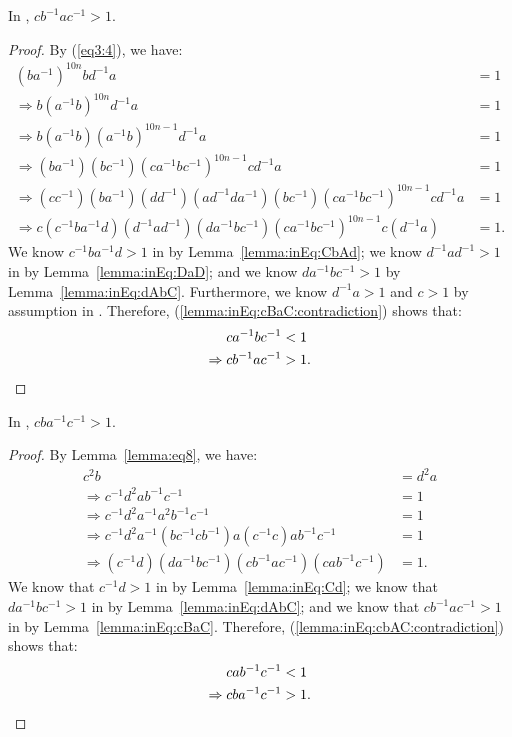 \begin{lemma} In , $cb^{-1}ac^{-1}>1$.
\label{lemma:inEq:cBaC}
\end{lemma}
\begin{proof} By (\ref{eq3:4}), we have:
\begin{align}
(ba^{-1})^{10n}bd^{-1}a&=1\nonumber{}\\
\Rightarrow{}b(a^{-1}b)^{10n}d^{-1}a&=1\nonumber{}\\
\Rightarrow{}b(a^{-1}b)(a^{-1}b)^{10n-1}d^{-1}a&=1\nonumber{}\\
\Rightarrow{}(ba^{-1})(bc^{-1})(ca^{-1}bc^{-1})^{10n-1}cd^{-1}a&=1\nonumber{}\\
\Rightarrow{}(cc^{-1})(ba^{-1})(dd^{-1})(ad^{-1}da^{-1})(bc^{-1})(ca^{-1}bc^{-1})^{10n-1}cd^{-1}a&=1\nonumber{}\\
\Rightarrow{}c(c^{-1}ba^{-1}d)(d^{-1}ad^{-1})(da^{-1}bc^{-1})(ca^{-1}bc^{-1})^{10n-1}c(d^{-1}a)&=1.\label{lemma:inEq:cBaC:contradiction}
\end{align}
We know $c^{-1}ba^{-1}d>1$ in  by Lemma~\ref{lemma:inEq:CbAd}; we know $d^{-1}ad^{-1}>1$ in  by Lemma~\ref{lemma:inEq:DaD}; and we know $da^{-1}bc^{-1}>1$ by Lemma~\ref{lemma:inEq:dAbC}. Furthermore, we know $d^{-1}a>1$ and $c>1$ by assumption in . Therefore, (\ref{lemma:inEq:cBaC:contradiction}) shows that:
\begin{align*}
ca^{-1}bc^{-1}&<1\\
\Rightarrow{}cb^{-1}ac^{-1}&>1.\qedhere
\end{align*}
\end{proof}

\begin{lemma} In , $cba^{-1}c^{-1}>1$.
\label{lemma:inEq:cbAC}
\end{lemma}
\begin{proof} By Lemma~\ref{lemma:eq8}, we have:
\begin{align}
c^{2}b&=d^{2}a\nonumber{}\\
\Rightarrow{}c^{-1}d^{2}ab^{-1}c^{-1}&=1\nonumber{}\\
\Rightarrow{}c^{-1}d^{2}a^{-1}a^{2}b^{-1}c^{-1}&=1\nonumber{}\\
\Rightarrow{}c^{-1}d^{2}a^{-1}(bc^{-1}cb^{-1})a(c^{-1}c)ab^{-1}c^{-1}&=1\nonumber{}\\
\Rightarrow{}(c^{-1}d)(da^{-1}bc^{-1})(cb^{-1}ac^{-1})(cab^{-1}c^{-1})&=1.\label{lemma:inEq:cbAC:contradiction}
\end{align}
We know that $c^{-1}d>1$ in  by Lemma~\ref{lemma:inEq:Cd}; we know that $da^{-1}bc^{-1}>1$ in  by Lemma~\ref{lemma:inEq:dAbC}; and we know that $cb^{-1}ac^{-1}>1$ in  by Lemma~\ref{lemma:inEq:cBaC}. Therefore, (\ref{lemma:inEq:cbAC:contradiction}) shows that:
\begin{align*}
cab^{-1}c^{-1}&<1\\
\Rightarrow{}cba^{-1}c^{-1}&>1.\qedhere
\end{align*}
\end{proof}

